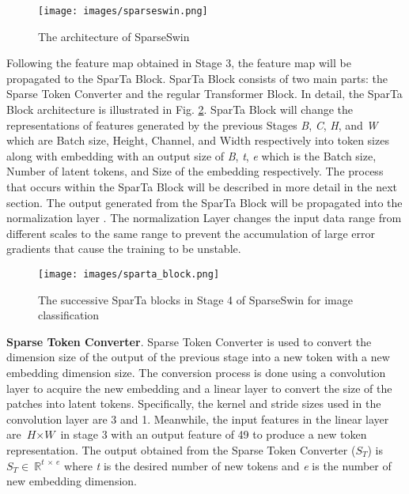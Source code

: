 \documentclass[runningheads]{llncs}
\begin{document}
\begin{figure}[bp]
    \centering
    \texttt{[image: images/sparseswin.png]}
    \caption{The architecture of SparseSwin}
    \label{fig:architecture}
\end{figure}

Following the feature map obtained in Stage 3, the feature map will be propagated to the SparTa Block. SparTa Block consists of two main parts: the Sparse Token Converter and the regular Transformer Block. In detail, the SparTa Block architecture is illustrated in Fig. \ref{fig:sparta_successive_blocks}. SparTa Block will change the representations of features generated by the previous Stages \textit{B}, \textit{C}, \textit{H}, and \textit{W} which are Batch size, Height, Channel, and Width respectively into token sizes along with embedding with an output size of \textit{B}, \textit{t}, \textit{e} which is the Batch size, Number of latent tokens, and Size of the embedding respectively. The process that occurs within the SparTa Block will be described in more detail in the next section. The output generated from the SparTa Block will be propagated into the normalization layer \cite{ba2016layer}. The normalization Layer changes the input data range from different scales to the same range to prevent the accumulation of large error gradients that cause the training to be unstable.

\begin{figure}[htp]
    \centering
    \texttt{[image: images/sparta\_block.png]}
    \caption{The successive SparTa blocks in Stage 4 of SparseSwin for image classification}
    \label{fig:sparta_successive_blocks}
\end{figure}

\textbf{Sparse Token Converter}. Sparse Token Converter is used to convert the dimension size of the output of the previous stage into a new token with a new embedding dimension size. The conversion process is done using a convolution layer \cite{lecun1995convolutional} to acquire the new embedding and a linear layer to convert the size of the patches into latent tokens. Specifically, the kernel and stride sizes used in the convolution layer are 3 and 1. Meanwhile, the input features in the linear layer are $\textit{H}\times \textit{W}$ in stage 3 with an output feature of 49 to produce a new token representation. The output obtained from the Sparse Token Converter ($S_T$) is $S_T\in\ \mathbb{R}^{t\ \times\ e}$ where \textit{t} is the desired number of new tokens and \textit{e} is the number of new embedding dimension.
\end{document}
